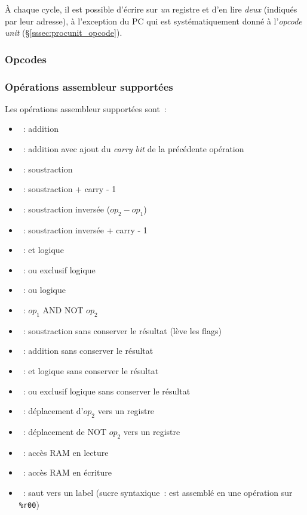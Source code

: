 \documentclass[11pt,a4paper]{article}
\begin{document}
À chaque cycle, il est possible d'écrire sur \emph{un} registre et d'en lire \emph{deux} (indiqués par leur adresse), à l'exception du PC qui est systématiquement donné à l'\textit{opcode unit} (§\ref{sssec:procunit_opcode}).

\subsubsection{Opcodes} \label{sssec:opcodes}


\subsubsection{Opérations assembleur supportées}

Les opérations assembleur supportées sont~:
\begin{itemize}
\item {}~: addition
\item {}~: addition avec ajout du \textit{carry bit} de la précédente opération
\item {}~: soustraction
\item {}~: soustraction + carry - 1
\item {}~: soustraction inversée ($op_2 - op_1$)
\item {}~: soustraction inversée + carry - 1
\item {}~: et logique
\item {}~: ou exclusif logique
\item {}~: ou logique
\item {}~: $op_1$ AND NOT $op_2$
\item {}~: soustraction sans conserver le résultat (lève les flags)
\item {}~: addition sans conserver le résultat
\item {}~: et logique sans conserver le résultat
\item {}~: ou exclusif logique sans conserver le résultat
\item {}~: déplacement d'$op_2$ vers un registre
\item {}~: déplacement de NOT $op_2$ vers un registre
\item {}~: accès RAM en lecture
\item {}~: accès RAM en écriture
\item {}~: saut vers un label (sucre syntaxique~: est assemblé en une opération sur \texttt{\%r00})
\end{itemize}
\end{document}
